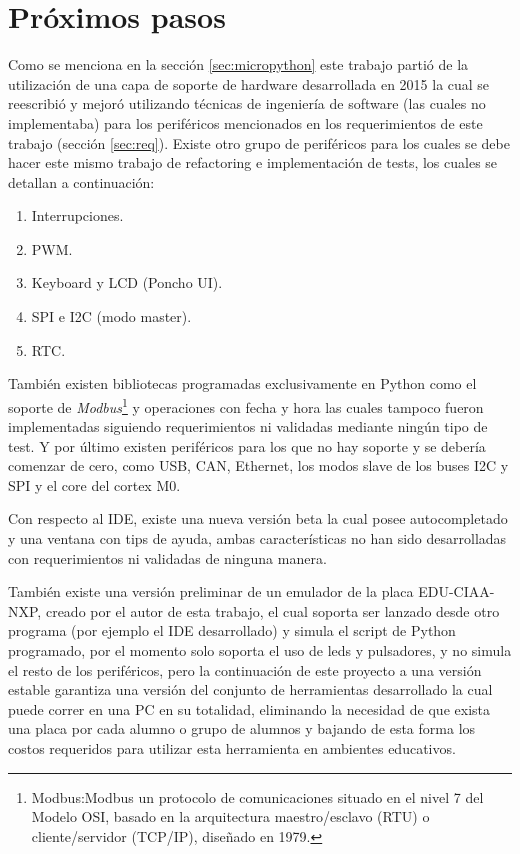 \section{Próximos pasos}

Como se menciona en la sección \ref{sec:micropython} este trabajo partió de la utilización de una capa de soporte de hardware desarrollada en 2015 la cual se reescribió y mejoró utilizando técnicas de ingeniería de software (las cuales no implementaba) para los periféricos mencionados en los requerimientos de este trabajo (sección \ref{sec:req}). Existe otro grupo de periféricos para los cuales se debe hacer este mismo trabajo de refactoring e implementación de tests, los cuales se detallan a continuación:

\begin{enumerate}
	\item  Interrupciones.
	\item  PWM.
	\item  Keyboard y LCD (Poncho UI). 
	\item  SPI e I2C (modo master).
	\item  RTC.
\end{enumerate}

También existen bibliotecas programadas exclusivamente en Python como el soporte de \textit{Modbus}\footnote{Modbus:Modbus un protocolo de comunicaciones situado en el nivel 7 del Modelo OSI, basado en la arquitectura maestro/esclavo (RTU) o cliente/servidor (TCP/IP), diseñado en 1979.} y operaciones con fecha y hora las cuales tampoco fueron implementadas siguiendo requerimientos ni validadas mediante ningún tipo de test. Y por último existen periféricos para los que no hay soporte y se debería comenzar de cero, como USB, CAN, Ethernet, los modos slave de los buses I2C y SPI y el core del cortex M0.

Con respecto al IDE, existe una nueva versión beta la cual posee autocompletado y una ventana con tips de ayuda, ambas características no han sido desarrolladas con requerimientos ni validadas de ninguna manera.

También existe una versión preliminar de un emulador de la placa EDU-CIAA-NXP, creado por el autor de esta trabajo, el cual soporta ser lanzado desde otro programa (por ejemplo el IDE desarrollado) y simula el script de Python programado, por el momento solo soporta el uso de leds y pulsadores, y no simula el resto de los periféricos, pero la continuación de este proyecto a una versión estable garantiza una versión del conjunto de herramientas desarrollado la cual puede correr en una PC en su totalidad, eliminando la necesidad de que exista una placa por cada alumno o grupo de alumnos y bajando de esta forma los costos requeridos para utilizar esta herramienta en ambientes educativos.

